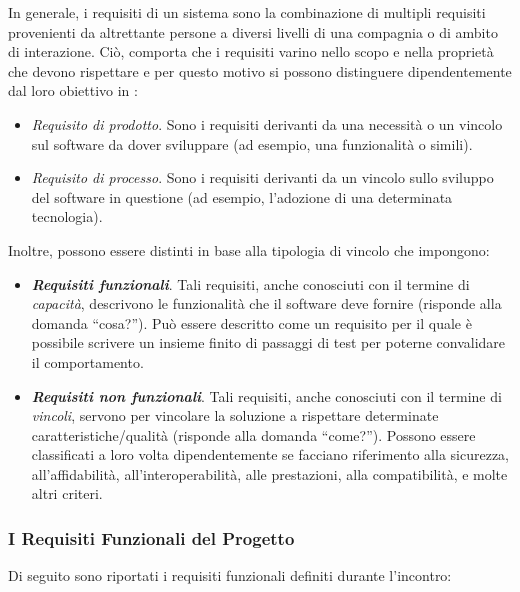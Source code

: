 In generale, i requisiti di un sistema sono la combinazione di multipli requisiti provenienti da altrettante persone a diversi livelli di una compagnia o di ambito di interazione. Ciò, comporta che i requisiti varino nello scopo e nella proprietà che devono rispettare e per questo motivo si possono distinguere dipendentemente dal loro obiettivo in \cite{requirements_types}:

\begin{itemize}
    \item \textit{Requisito di prodotto}. Sono i requisiti derivanti da una necessità o un vincolo sul software da dover sviluppare (ad esempio, una funzionalità o simili).
    \item \textit{Requisito di processo}. Sono i requisiti derivanti da un vincolo sullo sviluppo del software in questione (ad esempio, l'adozione di una determinata tecnologia).
\end{itemize}

Inoltre, possono essere distinti in base alla tipologia di vincolo che impongono:

\begin{itemize}
    \item \textit{\textbf{Requisiti funzionali}}. Tali requisiti, anche conosciuti con il termine di \textit{capacità}, descrivono le funzionalità che il software deve fornire (risponde alla domanda ``cosa?''). Può essere descritto come un requisito per il quale è possibile scrivere un insieme finito di passaggi di test per poterne convalidare il comportamento.
    \item \textit{\textbf{Requisiti non funzionali}}. Tali requisiti, anche conosciuti con il termine di \textit{vincoli}, servono per vincolare la soluzione a rispettare determinate caratteristiche/qualità (risponde alla domanda ``come?''). Possono essere classificati a loro volta dipendentemente se facciano riferimento alla sicurezza, all'affidabilità, all'interoperabilità, alle prestazioni, alla compatibilità, e molte altri criteri.
\end{itemize}

\subsubsection{I Requisiti Funzionali del Progetto}

Di seguito sono riportati i requisiti funzionali definiti durante l'incontro:

